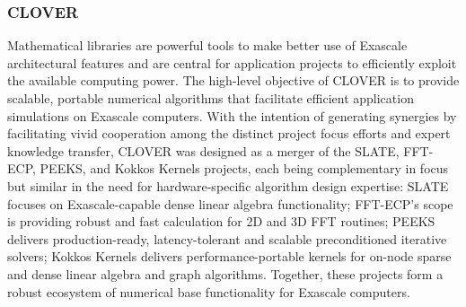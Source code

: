 \subsubsection{ CLOVER} 
Mathematical libraries are powerful tools to make better use of Exascale 
architectural features and are central for application projects to efficiently 
exploit the available computing power. The high-level objective of CLOVER is to 
provide scalable, portable numerical algorithms that facilitate efficient 
application simulations on Exascale computers. With the intention of generating synergies 
by facilitating vivid cooperation among the distinct project focus efforts 
and expert knowledge transfer, CLOVER was designed as a merger of the SLATE, 
FFT-ECP, PEEKS, and Kokkos Kernels projects, each being complementary 
in focus but similar in the need for hardware-specific algorithm design 
expertise: SLATE focuses on Exascale-capable dense linear algebra 
functionality; FFT-ECP’s scope is providing robust and fast calculation for 2D 
and 3D FFT routines; PEEKS delivers production-ready, latency-tolerant and 
scalable preconditioned iterative solvers; Kokkos Kernels delivers
performance-portable kernels for on-node sparse and dense linear algebra and 
graph algorithms. Together, these projects form a robust ecosystem of numerical 
base functionality for Exascale computers.
